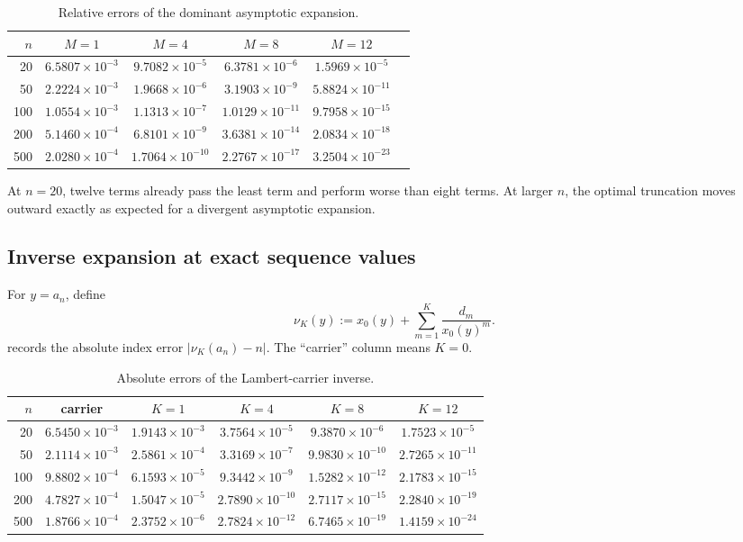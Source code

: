 \documentclass[11pt,oneside]{article}
\numberwithin{equation}{section}
\theoremstyle{plain}
\theoremstyle{definition}
\theoremstyle{remark}
\begin{document}
\begin{table}[H]
\centering
\caption{Relative errors of the dominant asymptotic expansion.}
\label{tab:forward-errors}
\begin{tabular}{@{}rccccc@{}}
\toprule
$n$ & $M=1$ & $M=4$ & $M=8$ & $M=12$ \\
\midrule
20  & $6.5807\times10^{-3}$ & $9.7082\times10^{-5}$ & $6.3781\times10^{-6}$ & $1.5969\times10^{-5}$\\
50  & $2.2224\times10^{-3}$ & $1.9668\times10^{-6}$ & $3.1903\times10^{-9}$ & $5.8824\times10^{-11}$\\
100 & $1.0554\times10^{-3}$ & $1.1313\times10^{-7}$ & $1.0129\times10^{-11}$ & $9.7958\times10^{-15}$\\
200 & $5.1460\times10^{-4}$ & $6.8101\times10^{-9}$ & $3.6381\times10^{-14}$ & $2.0834\times10^{-18}$\\
500 & $2.0280\times10^{-4}$ & $1.7064\times10^{-10}$ & $2.2767\times10^{-17}$ & $3.2504\times10^{-23}$\\
\bottomrule
\end{tabular}
\end{table}

At $n=20$, twelve terms already pass the least term and perform worse than
eight terms.  At larger $n$, the optimal truncation moves outward exactly as
expected for a divergent asymptotic expansion.

\subsection{Inverse expansion at exact sequence values}

For $y=a_n$, define
\begin{equation}\label{eq:nu-K}
 \nu_K(y):=x_0(y)+\sum_{m=1}^{K}\frac{d_m}{x_0(y)^m}.
\end{equation}
 records the absolute index error
$|\nu_K(a_n)-n|$.  The ``carrier'' column means $K=0$.

\begin{table}[H]
\centering
\caption{Absolute errors of the Lambert-carrier inverse.}
\label{tab:inverse-errors}
\begin{tabular}{@{}rccccc@{}}
\toprule
$n$ & carrier & $K=1$ & $K=4$ & $K=8$ & $K=12$\\
\midrule
20  & $6.5450\times10^{-3}$ & $1.9143\times10^{-3}$ & $3.7564\times10^{-5}$ & $9.3870\times10^{-6}$ & $1.7523\times10^{-5}$\\
50  & $2.1114\times10^{-3}$ & $2.5861\times10^{-4}$ & $3.3169\times10^{-7}$ & $9.9830\times10^{-10}$ & $2.7265\times10^{-11}$\\
100 & $9.8802\times10^{-4}$ & $6.1593\times10^{-5}$ & $9.3442\times10^{-9}$ & $1.5282\times10^{-12}$ & $2.1783\times10^{-15}$\\
200 & $4.7827\times10^{-4}$ & $1.5047\times10^{-5}$ & $2.7890\times10^{-10}$ & $2.7117\times10^{-15}$ & $2.2840\times10^{-19}$\\
500 & $1.8766\times10^{-4}$ & $2.3752\times10^{-6}$ & $2.7824\times10^{-12}$ & $6.7465\times10^{-19}$ & $1.4159\times10^{-24}$\\
\bottomrule
\end{tabular}
\end{table}
\end{document}
